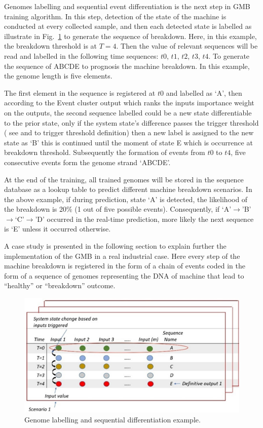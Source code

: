 \documentclass[conference]{IEEEtran}
\begin{document}
Genomes labelling and sequential event differentiation is  the next step in GMB training algorithm. In this step, detection of the state of the machine is conducted at every collected sample, and then each detected state is labelled as illustrate in Fig.~\ref{fig:Genome_labelling} to generate the sequence of breakdown. Here, in this example, the breakdown threshold is at $T=4$. Then the value of relevant sequences will be read and labelled in the following time sequences:  $t0$, $t1$, $t2$, $t3$, $t4$. To generate the sequence of ABCDE to prognosis the machine breakdown. In this example, the genome length is five elements.

The first element in the sequence is registered at $t0$   and labelled as ‘A’, then according to the Event cluster output \cite{Kumar2019} which ranks the inputs importance weight on the outputs, the second sequence labelled could be a new state differentiable to the prior state, only if the system state’s difference passes the trigger threshold ( see \cite{Danishvar2018} and \cite{Tavakoli2013} to trigger threshold definition) then a new label is assigned to the new state as ‘B’ this is continued until the moment of state E which is occurrence at breakdown threshold. Subsequently the formation of events from $t0$ to $t4$, five consecutive events form the genome strand ‘ABCDE’.

At the end of the training, all trained genomes will be stored in the sequence database as a lookup table to predict different machine breakdown scenarios. In the above example, if during prediction, state ‘A’ is detected, the likelihood of the breakdown is 20\% (1 out of five possible events). Consequently, if ‘A’$\to$’B’$\to$‘C’$\to$’D’ occurred in the real-time prediction, more likely the next sequence is ‘E’ unless it occurred otherwise. 

A case study is presented in the following section to explain further the implementation of the GMB in a real industrial case. Here every step of the machine breakdown is registered in the form of a chain of events coded in the form of a sequence of genomes representing the DNA of machine that lead to “healthy” or “breakdown” outcome.
\begin{figure}[htbp]
\centerline{\includegraphics[width=\linewidth]{Genome_Labelling.png}}
\caption{Genome labelling and sequential differentiation example.}
\label{fig:Genome_labelling}
\end{figure}
\end{document}

